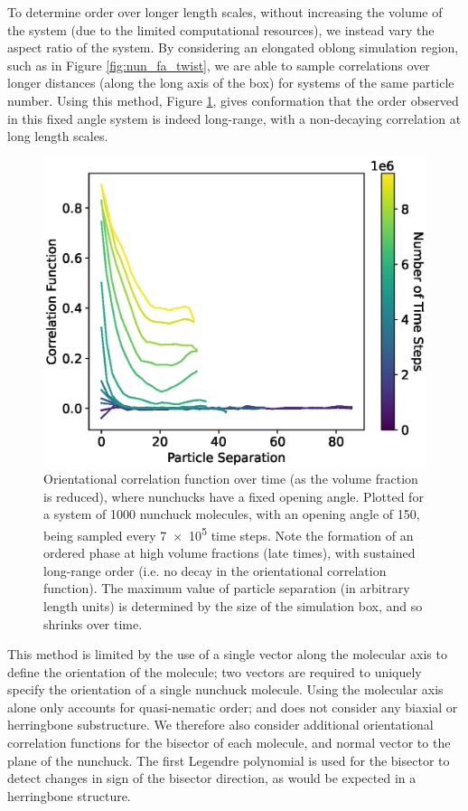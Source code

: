 \documentclass[11pt, a4paper]{article} %
\begin{document}
To determine order over longer length scales, without increasing the volume of the system (due to the limited computational resources), we instead vary the aspect ratio of the system. By considering an elongated oblong simulation region, such as in Figure \ref{fig:nun_fa_twist}, we are able to sample correlations over longer distances (along the long axis of the box) for systems of the same particle number. Using this method, Figure \ref{fig:num_fa_correlation_mol}, gives conformation that the order observed in this fixed angle system is indeed long-range, with a non-decaying correlation at long length scales.

\begin{figure} [h!]
	\centering
	\includegraphics[width=0.7\linewidth]{Figures/num_fa_correlation_mol}
	\caption{Orientational correlation function over time (as the volume fraction is reduced), where nunchucks have a fixed opening angle. Plotted for a system of \num{1000} nunchuck molecules, with an opening angle of \SI{150}{\deg}, being sampled every \num{7e5} time steps. Note the formation of an ordered phase at high volume fractions (late times), with sustained long-range order (i.e. no decay in the orientational correlation function). The maximum value of particle separation (in arbitrary length units) is determined by the size of the simulation box, and so shrinks over time.}
	\label{fig:num_fa_correlation_mol}
\end{figure}  %


This method is limited by the use of a single vector along the molecular axis to define the orientation of the molecule; two vectors are required to uniquely specify the orientation of a single nunchuck molecule. Using the molecular axis alone only accounts for quasi-nematic order; and does not consider any biaxial or herringbone substructure. We therefore also consider additional orientational correlation functions for the bisector of each molecule, and normal vector to the plane of the nunchuck. The first Legendre polynomial is used for the bisector to detect changes in sign of the bisector direction, as would be expected in a herringbone structure.
\end{document}
